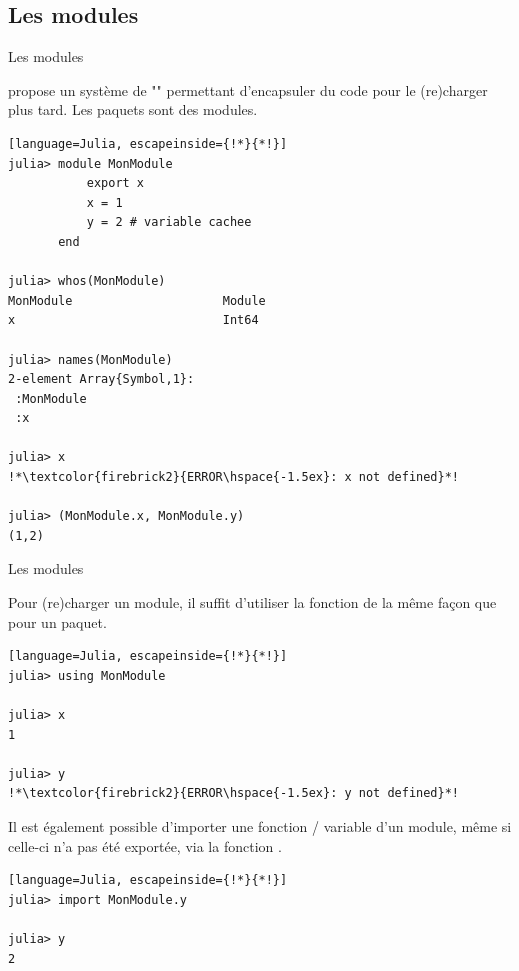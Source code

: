 \subsection{Les modules}
\begin{frame}[containsverbatim]{Les modules}
\par{{\Julia} propose un système de "" permettant d'encapsuler du code pour le (re)charger plus tard. Les paquets sont des modules.}
\begin{lstlisting}[language=Julia, escapeinside={!*}{*!}]
julia> module MonModule
           export x
           x = 1
           y = 2 # variable cachee
       end

julia> whos(MonModule)
MonModule                     Module
x                             Int64

julia> names(MonModule)
2-element Array{Symbol,1}:
 :MonModule
 :x

julia> x
!*\textcolor{firebrick2}{ERROR\hspace{-1.5ex}: x not defined}*!

julia> (MonModule.x, MonModule.y)
(1,2)
\end{lstlisting}
\end{frame}


\begin{frame}[containsverbatim]{Les modules}
\par{Pour (re)charger un module, il suffit d'utiliser la fonction  de la même façon que pour un paquet.}
\begin{lstlisting}[language=Julia, escapeinside={!*}{*!}]
julia> using MonModule

julia> x
1

julia> y
!*\textcolor{firebrick2}{ERROR\hspace{-1.5ex}: y not defined}*!
\end{lstlisting}
\par{Il est également possible d'importer une fonction / variable d'un module, même si celle-ci n'a pas été exportée, via la fonction .}
\begin{lstlisting}[language=Julia, escapeinside={!*}{*!}]
julia> import MonModule.y

julia> y
2
\end{lstlisting}
\end{frame}


